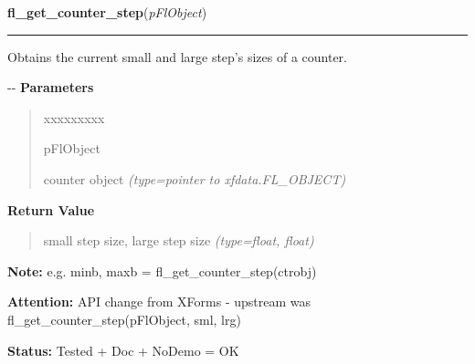 \hspace{.8\funcindent}\begin{boxedminipage}{\funcwidth}

    \raggedright \textbf{fl\_get\_counter\_step}(\textit{pFlObject})

    \vspace{-1.5ex}

    \rule{\textwidth}{0.5\fboxrule}
\setlength{\parskip}{2ex}

Obtains the current small and large step's sizes of a counter.

-{}-
\setlength{\parskip}{1ex}
      \textbf{Parameters}
      \vspace{-1ex}

      \begin{quote}
        \begin{Ventry}{xxxxxxxxx}

          \item[pFlObject]


counter object
            {\it (type=pointer to xfdata.FL\_OBJECT)}

        \end{Ventry}

      \end{quote}

      \textbf{Return Value}
    \vspace{-1ex}

      \begin{quote}

small step size, large step size
      {\it (type=float, float)}

      \end{quote}

\textbf{Note:} 
e.g. minb, maxb = fl\_get\_counter\_step(ctrobj)


\textbf{Attention:} 
API change from XForms - upstream was
fl\_get\_counter\_step(pFlObject, sml, lrg)


\textbf{Status:} 
Tested + Doc + NoDemo = OK


    \end{boxedminipage}

    \label{xformslib:flcounter:fl_set_counter_filter}

    \vspace{0.5ex}


